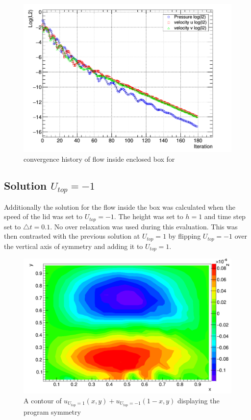 \documentclass[paper=a4, fontsize=11pt, abstract=on]{scrartcl}
\numberwithin{equation}{section}		%
\numberwithin{figure}{section}			%
\numberwithin{table}{section}				%
\begin{document}
\begin{figure}[H]
\centering
\includegraphics[width=0.80\linewidth]{con3}
\caption{convergence history of flow inside enclosed box for  }
\label{conh}
\end{figure}

\subsection{Solution $U_{top} = -1$}
Additionally the solution for the flow inside the box was calculated when the speed of the lid was set to $U_{top} = -1$. The height was set to $h=1$ and time step set to $\triangle t = 0.1$. No over relaxation was used during this evaluation. This was then contrasted with the previous solution at $U_{top} = 1$ by flipping $U_{top} = -1$ over the vertical axis of symmetry and adding it to 
$U_{top} = 1$. 
\begin{figure}[H]
\centering
\includegraphics[width=0.80\linewidth]{sanity}
\caption{A contour of $u_{U_{top} = 1}(x,y) + u_{U_{top} = -1}(1-x,y)$ displaying the program symmetry}
\label{san1}
\end{figure}
\end{document}
